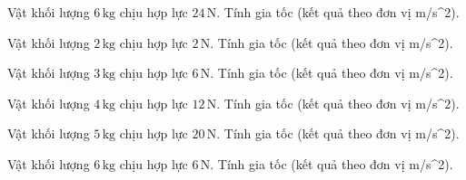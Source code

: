 \begin{ex}
Vật khối lượng $6\,\text{kg}$ chịu hợp lực $24\,\text{N}$. Tính gia tốc (kết quả theo đơn vị m/s^2).
\end{ex}

\begin{ex}
Vật khối lượng $2\,\text{kg}$ chịu hợp lực $2\,\text{N}$. Tính gia tốc (kết quả theo đơn vị m/s^2).
\end{ex}

\begin{bt}
Vật khối lượng $3\,\text{kg}$ chịu hợp lực $6\,\text{N}$. Tính gia tốc (kết quả theo đơn vị m/s^2).
\end{bt}

\begin{bt}
Vật khối lượng $4\,\text{kg}$ chịu hợp lực $12\,\text{N}$. Tính gia tốc (kết quả theo đơn vị m/s^2).
\end{bt}

\begin{bt}
Vật khối lượng $5\,\text{kg}$ chịu hợp lực $20\,\text{N}$. Tính gia tốc (kết quả theo đơn vị m/s^2).
\end{bt}

\begin{bt}
Vật khối lượng $6\,\text{kg}$ chịu hợp lực $6\,\text{N}$. Tính gia tốc (kết quả theo đơn vị m/s^2).
\end{bt}

